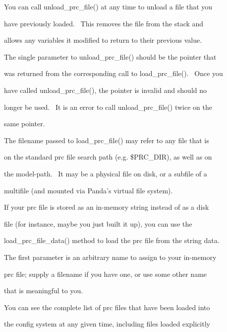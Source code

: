 \documentclass[a4paper]{article}
\begin{document}
\bigskip

{\color{black}
You can call unload\_prc\_file() at any time to unload a file that you}

{\color{black}
have previously loaded. \ This removes the file from the stack and}

{\color{black}
allows any variables it modified to return to their previous value.}

{\color{black}
The single parameter to unload\_prc\_file() should be the pointer that}

{\color{black}
was returned from the corresponding call to load\_prc\_file(). \ Once you}

{\color{black}
have called unload\_prc\_file(), the pointer is invalid and should no}

{\color{black}
longer be used. \ It is an error to call unload\_prc\_file() twice on the}

{\color{black}
same pointer.}


\bigskip

{\color{black}
The filename passed to load\_prc\_file() may refer to any file that is}

{\color{black}
on the standard prc file search path (e.g. \$PRC\_DIR), as well as on}

{\color{black}
the model-path. \ It may be a physical file on disk, or a subfile of a}

{\color{black}
multifile (and mounted via Panda's virtual file system).}


\bigskip

{\color{black}
If your prc file is stored as an in-memory string instead of as a disk}

{\color{black}
file (for instance, maybe you just built it up), you can use the}

{\color{black}
load\_prc\_file\_data() method to load the prc file from the string data.}

{\color{black}
The first parameter is an arbitrary name to assign to your in-memory}

\clearpage
\bigskip

{\color{black}
prc file; supply a filename if you have one, or use some other name}

{\color{black}
that is meaningful to you.}


\bigskip

{\color{black}
You can see the complete list of prc files that have been loaded into}

{\color{black}
the config system at any given time, including files loaded explicitly}
\end{document}
